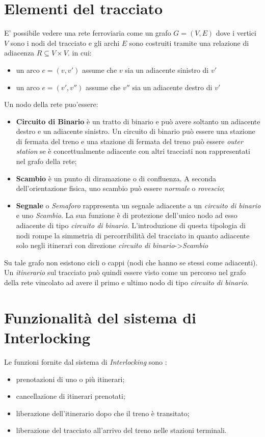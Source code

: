 \documentclass[10pt,a4paper,oneside]{report}
\begin{document}
\section{Elementi del tracciato}
E' possibile vedere una rete ferroviaria come un grafo $G =(V,E) $ dove i vertici $V$ sono i nodi del tracciato e gli archi $E$ sono costruiti tramite una relazione di adiacenza $R \subseteq V \times V$. in cui:
\begin{itemize}
\item un arco $e=(v,v')$ assume che $v$ sia un adiacente sinistro di $v'$
\item un arco $e=(v',v'')$ assume che $v''$ sia un adiacente destro di $v'$
\end{itemize}
Un nodo della rete puo'essere:
\begin{itemize}
\item \textbf{Circuito di Binario} è un tratto di binario e può avere soltanto un adiacente destro e un adiacente sinistro. Un circuito di binario può essere una stazione di fermata del treno e una stazione di fermata del treno può essere \emph{outer station} se è concettualmente adiacente con altri tracciati non rappresentati nel grafo della rete;
\item \textbf{Scambio} è un punto di diramazione o di confluenza. A seconda dell'orientazione fisica, uno scambio può essere \textit{normale} o \textit{rovescio};
\item \textbf{Segnale} o \emph{Semaforo} rappresenta un segnale adiacente a un \emph{circuito di binario} e uno \emph{Scambio}. La sua funzione è di protezione dell'unico nodo ad esso adiacente di tipo \emph{circuito di binario}.  L'introduzione di questa tipologia di nodi rompe la simmetria di percorribilità del tracciato in quanto adiacente solo negli itinerari con direzione \emph{circuito di binario}->\emph{Scambio}
\end{itemize}
Su tale grafo non esistono cicli o cappi (nodi che hanno se stessi come adiacenti).
Un \emph{itinerario} sul tracciato può quindi essere visto come un percorso nel grafo della rete vincolato ad avere il primo e ultimo nodo di tipo \emph{circuito di binario}.
\section{Funzionalità del sistema di Interlocking}
Le funzioni fornite dal sistema di \emph{Interlocking} sono :
\begin{itemize}
\item prenotazioni di uno o più itinerari;
\item cancellazione di itinerari prenotati;
\item liberazione dell'itinerario dopo che il treno è transitato;
\item liberazione del tracciato all'arrivo del treno nelle stazioni terminali.
\end{itemize}
\end{document}
